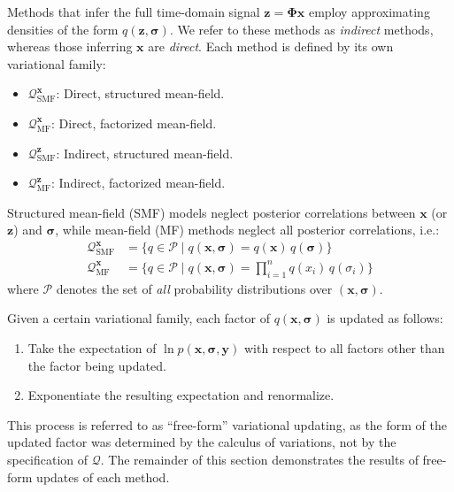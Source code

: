 \documentclass{article}
\newcommand{\m}[1]{\boldsymbol{#1}}
\begin{document}
Methods that infer the full time-domain signal $\m{z} = \m{\Phi} \m{x}$
employ approximating densities of the form $q(\m{z}, \m{\sigma})$. We
refer to these methods as \emph{indirect} methods, whereas those
inferring $\m{x}$ are \emph{direct}. Each method is defined by
its own variational family:
\begin{itemize}
 \item $\mathcal{Q}_{\text{SMF}}^{\m{x}}$: Direct, structured mean-field.
 \item $\mathcal{Q}_{\text{MF}}^{\m{x}}$: Direct, factorized mean-field.
 \item $\mathcal{Q}_{\text{SMF}}^{\m{z}}$: Indirect, structured mean-field.
 \item $\mathcal{Q}_{\text{MF}}^{\m{z}}$: Indirect, factorized mean-field.
\end{itemize}
Structured mean-field (SMF) models neglect posterior correlations between
$\m{x}$ (or $\m{z}$) and $\m{\sigma}$, while mean-field (MF) methods
neglect all posterior correlations, i.e.:
\begin{equation}
\begin{aligned}
\mathcal{Q}_{\text{SMF}}^{\m{x}} &= \big\{
  q \in \mathcal{P}
 \;\big|\;
  q(\m{x}, \m{\sigma}) = q(\m{x}) \, q(\m{\sigma})
 \big\}
\\
\mathcal{Q}_{\text{MF}}^{\m{x}} &= \big\{
  q \in \mathcal{P}
 \;\big|\;
  q(\m{x}, \m{\sigma}) = {\textstyle\prod}_{i=1}^n q(x_i) \, q(\sigma_i)
 \big\}
\end{aligned}
\label{eq:smf_mf}
\end{equation}
where $\mathcal{P}$ denotes the set of \emph{all} probability distributions
over $(\m{x}, \m{\sigma})$.

Given a certain variational family, each factor of $q(\m{x}, \m{\sigma})$
is updated as follows:
\begin{enumerate}
 \item Take the expectation of $\ln p(\m{x}, \m{\sigma}, \m{y})$ with
  respect to all factors other than the factor being updated.
 \item Exponentiate the resulting expectation and renormalize.
\end{enumerate}
This process is referred to as ``free-form'' variational updating, as the
form of the updated factor was determined by the calculus of variations,
not by the specification of $\mathcal{Q}$. The remainder of this section
demonstrates the results of free-form updates of each method.

\end{document}
